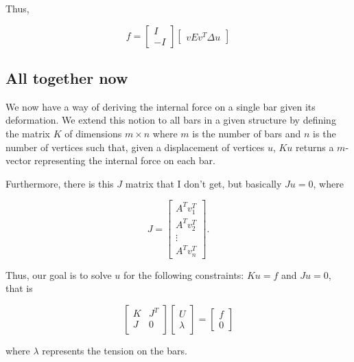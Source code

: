 \documentclass[11pt]{article}
\theoremstyle{definition}
\begin{document}
Thus,

\begin{equation}
  f = \left[ \begin{matrix}
       I \\
      -I
  \end{matrix} \right]
  \left[ \begin{matrix}
      v E v^T \Delta u
  \end{matrix} \right]
\end{equation}

\subsection{All together now}
We now have a way of deriving the internal force on a single bar given its
deformation. We extend this notion to all bars in a given structure by defining
the matrix $K$ of dimensions $m \times n$ where $m$ is the number of bars and
$n$ is the number of vertices such that, given a displacement of vertices $u$,
$Ku$ returns a $m$-vector representing the internal force on each bar.

Furthermore, there is this $J$ matrix that I don't get, but basically $Ju = 0$,
where

\[ 
  J = \left[\begin{matrix}
    A^T v_1^T \\
    A^T v_2^T \\
    \vdots \\
    A^T v_n^T
\end{matrix} \right].
\]

Thus, our goal is to solve $u$ for the following constraints: $Ku = f$ and $Ju =
0$, that is

\begin{equation}
  \left[ \begin{matrix}
      K & J^T \\
      J & 0 \\
  \end{matrix} \right]
  \left[ \begin{matrix}
      U \\
      \lambda 
  \end{matrix} \right]
  =
  \left[ \begin{matrix}
      f \\
      0
  \end{matrix} \right]
  \label{eqn:primal}
\end{equation}

where $\lambda$ represents the tension on the bars.
\end{document}
